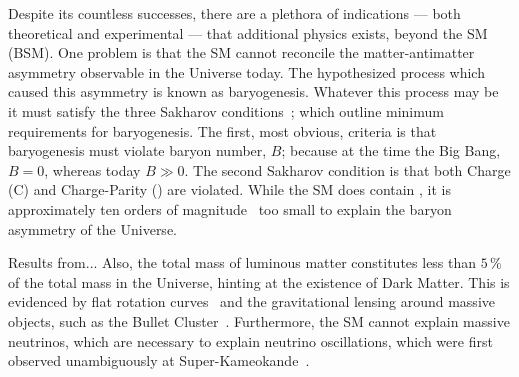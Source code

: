 Despite its countless successes, there are a plethora of indications --- both
theoretical and experimental --- that additional physics exists, beyond the SM (BSM).
One problem is that the SM cannot reconcile the matter-antimatter asymmetry observable in the
Universe today.
The hypothesized process which caused this asymmetry is known as baryogenesis.
Whatever this process may be it must satisfy the three Sakharov
conditions~\cite{1991SvPhU..34..392S}; which outline minimum requirements for baryogenesis.
The first, most obvious, criteria is that baryogenesis must violate baryon number, $B$; because at
the time the Big Bang, $B=0$, whereas today $B\gg0$.
The second Sakharov condition is that both Charge (C) and Charge-Parity (\CP) are violated.
While the SM does contain \CPV, it is approximately ten orders of
magnitude~\cite{Cline:2006ts,Huet:1994jb} too small to explain the baryon asymmetry of the
Universe.

Results from...
Also, the total mass of luminous matter constitutes less than $5\,\%$ of the
total mass in the Universe, hinting at the existence of Dark Matter.
This is evidenced by flat rotation
curves~\cite{1970ApJ...159..379R,1980ApJ...238..471R} and the gravitational lensing around massive
objects, such as the Bullet Cluster~\cite{Markevitch:2003at}.
Furthermore, the SM cannot explain massive neutrinos, which are necessary to explain neutrino
oscillations, which were first observed unambiguously at
Super-Kameokande~\cite{PhysRevLett.81.1562}.




